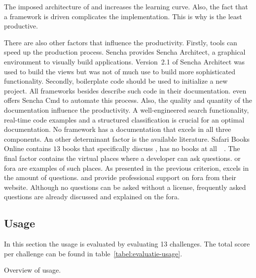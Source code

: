 \documentclass[a4paper]{artikel3}
\begin{document}
The imposed architecture of \sta{} and \kendoa{} increases the learning curve.
Also, the fact that a framework is \js{} driven complicates the implementation.
This is why \sta{} is the least productive.

There are also other factors that influence the productivity.
Firstly,  tools can speed up the production process.
Sencha provides Sencha Architect,  a graphical environment to visually build applications.
Version~2.1 of Sencha Architect was used to build the views but was not of much use to build more sophisticated functionality.
Secondly,  boilerplate code should be used to initialize a new project.
All frameworks besides \lungo{} describe such code in their documentation.
\sta{} even offers Sencha Cmd to automate this process.
Also, the quality and quantity of the documentation influence the productivity.
A well-engineered search functionality,  real-time code examples and a structured classification is crucial for an optimal documentation.
No framework has a documentation that excels in all three components.  
An other determinant factor is the available literature.
Safari Books Online contains $13$ books that specifically discuss \jqma{},  \lungo{} has no books at all~~\cite{O'Reilly2013}.
The final factor contains the virtual places where a developer can ask questions.
\so{} or fora are examples of such places.
As presented in the previous criterion,  \jqma{} excels in the amount of \so{} questions.
\sta{} and \kendoa{} provide professional support on fora from their website.
Although no questions can be asked without a license,  frequently asked questions are already discussed and explained on the fora.


\subsection{Usage}
\label{sec:evaluation-usage}
In this section the usage is evaluated by evaluating 13 challenges.
The total score per challenge can be found in table~\ref{tabel:evaluatie-usage}.

\begin{table}[!b]
\centering
\resizebox{\columnwidth}{!} {
}
\caption{Overview of usage.}
\label{tabel:evaluatie-usage}
\end{table}
\end{document}
